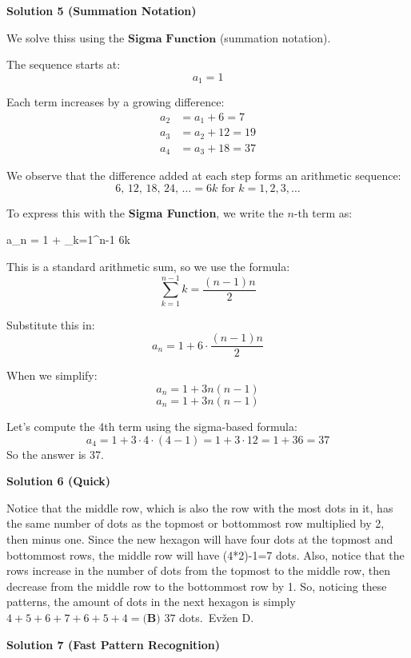 \begin{enumerate}
 



\textbf{Solution 5 (Summation Notation)}

We solve thiss using the $\textbf{Sigma Function}$ (summation notation).

 The sequence starts at:\[a_1 = 1\]

 Each term increases by a growing difference:\[\begin{aligned}a_2 &= a_1 + 6 = 7 \\a_3 &= a_2 + 12 = 19 \\a_4 &= a_3 + 18 = 37\end{aligned}\]

 We observe that the difference added at each step forms an arithmetic sequence:  \[6,\, 12,\, 18,\, 24,\, \dots = 6k \text{ for } k = 1, 2, 3, \dots\]

 To express this with the \textbf{Sigma Function}, we write the $n$-th term as:

 a\_n = 1 + \sum\_{k=1}\textasciicircum{}{n-1} 6k\]

 This is a standard arithmetic sum, so we use the formula:\[\sum_{k=1}^{n-1} k = \frac{(n-1)n}{2}\]

 Substitute this in:\[a_n = 1 + 6 \cdot \frac{(n-1)n}{2}\]

 When we simplify:\[a_n = 1 + 3n(n - 1)\]\[\boxed{a_n = 1 + 3n(n - 1)}\]

 Let’s compute the 4th term using the sigma-based formula:\[a_4 = 1 + 3 \cdot 4 \cdot (4 - 1) = 1 + 3 \cdot 12 = 1 + 36 = \boxed{37}\]So the answer is 37.

 



\textbf{Solution 6 (Quick)}

Notice that the middle row, which is also the row with the most dots in it, has the same number of dots as the topmost or bottommost row multiplied by 2, then minus one. Since the new hexagon will have four dots at the topmost and bottommost rows, the middle row will have (4*2)-1=7 dots. Also, notice that the rows increase in the number of dots from the topmost to the middle row, then decrease from the middle row to the bottommost row by 1. So, noticing these patterns, the amount of dots in the next hexagon is simply $4+5+6+7+6+5+4=\boxed{\textbf{(B) }37}$ dots.~Evžen D.

 



\textbf{Solution 7 (Fast Pattern Recognition)}


\end{enumerate}
